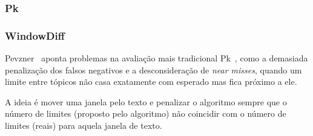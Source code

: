 \subsubsection{Pk}

\subsubsection{WindowDiff}

Pevzner~\cite{Pevzner200219} aponta problemas na avaliação mais tradicional Pk~\cite{Beeferman1999}, como a demasiada penalização dos falsos negativos e a desconsideração de \textit{near misses}, quando um limite entre tópicos não casa exatamente com esperado mas fica próximo a ele.

A ideia é mover uma janela pelo texto e penalizar o algoritmo sempre que o número de limites (proposto pelo algoritmo) não coincidir com o número de limites (reais) para aquela janela de texto. %
